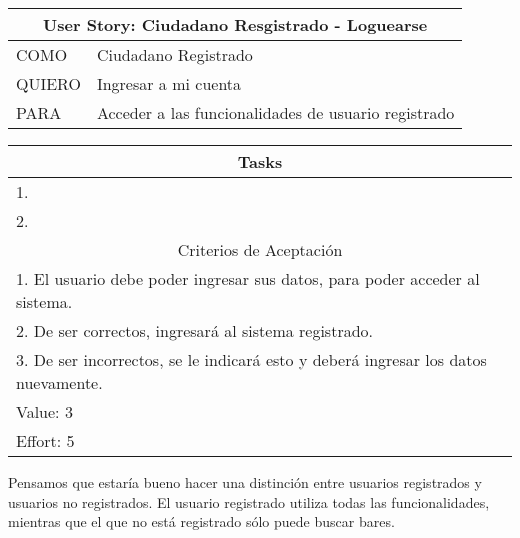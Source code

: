     \begin{table}[H]
        \centering
        \begin{tabular}{| p{1.5cm}| p{10.2cm} |}
            \hline
            \multicolumn{2}{|c|}{User Story: Ciudadano Resgistrado - Loguearse} \\
            \hline
            COMO & Ciudadano Registrado \\ \hline
            QUIERO & Ingresar a mi cuenta \\ \hline
            PARA & Acceder a las funcionalidades de usuario registrado \\ \hline
            \hline
        \end{tabular}
        \begin{tabular}{| p{12.118cm} |}
            \multicolumn{1}{|c|}{Tasks} \\
            \hline
            1. \\ \hline
            2. \\ \hline
            \hline
            \multicolumn{1}{|c|}{Criterios de Aceptación} \\
            \hline
            1. El usuario debe poder ingresar sus datos, para poder acceder al sistema. \\ \hline
            2. De ser correctos, ingresará al sistema registrado. \\ \hline
            3. De ser incorrectos, se le indicará esto y deberá ingresar los datos nuevamente. \\ \hline
            Value: 3 \\ \hline
            Effort: 5 \\ \hline
        \end{tabular}
    \end{table}
    
     Pensamos que estaría bueno hacer una distinción entre usuarios registrados y usuarios no registrados. El usuario registrado utiliza todas las funcionalidades, mientras que el que no está registrado sólo puede buscar bares. \\
    
